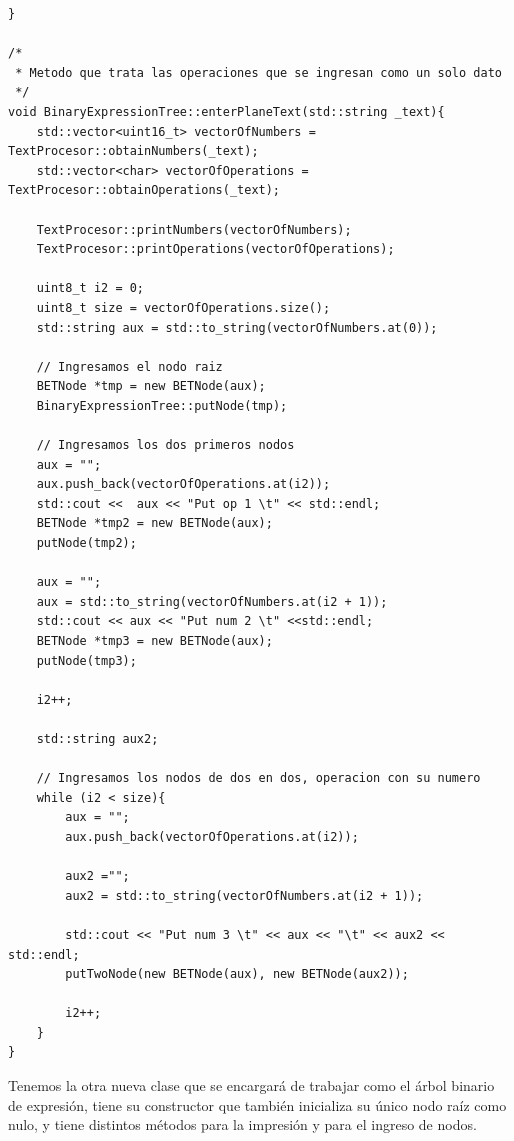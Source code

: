 \documentclass[a4paper,12pt]{article}
\begin{document}
\begin{verbatim}
}

/*
 * Metodo que trata las operaciones que se ingresan como un solo dato
 */
void BinaryExpressionTree::enterPlaneText(std::string _text){
    std::vector<uint16_t> vectorOfNumbers = TextProcesor::obtainNumbers(_text);
    std::vector<char> vectorOfOperations = TextProcesor::obtainOperations(_text);

    TextProcesor::printNumbers(vectorOfNumbers);
    TextProcesor::printOperations(vectorOfOperations);

    uint8_t i2 = 0;
    uint8_t size = vectorOfOperations.size();
    std::string aux = std::to_string(vectorOfNumbers.at(0));

    // Ingresamos el nodo raiz
    BETNode *tmp = new BETNode(aux);
    BinaryExpressionTree::putNode(tmp);

    // Ingresamos los dos primeros nodos
    aux = "";
    aux.push_back(vectorOfOperations.at(i2));
    std::cout <<  aux << "Put op 1 \t" << std::endl;
    BETNode *tmp2 = new BETNode(aux);
    putNode(tmp2);

    aux = "";
    aux = std::to_string(vectorOfNumbers.at(i2 + 1));
    std::cout << aux << "Put num 2 \t" <<std::endl;
    BETNode *tmp3 = new BETNode(aux);
    putNode(tmp3);

    i2++;

    std::string aux2;

    // Ingresamos los nodos de dos en dos, operacion con su numero
    while (i2 < size){
        aux = "";
        aux.push_back(vectorOfOperations.at(i2));

        aux2 ="";
        aux2 = std::to_string(vectorOfNumbers.at(i2 + 1));

        std::cout << "Put num 3 \t" << aux << "\t" << aux2 << std::endl;
        putTwoNode(new BETNode(aux), new BETNode(aux2));

        i2++;
    }
}
\end{verbatim} 

Tenemos la otra nueva clase que se encargará de trabajar como el árbol binario de expresión, tiene su constructor que también inicializa su único nodo raíz como nulo, y tiene distintos métodos para la impresión y para el ingreso de nodos.
\end{document}
